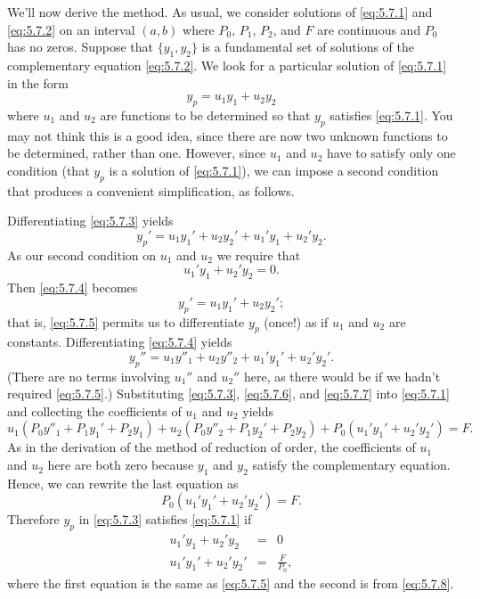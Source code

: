 \documentclass{ximera}
\begin{document}
We'll now derive the method. As usual, we consider solutions of
\eqref{eq:5.7.1} and \eqref{eq:5.7.2} on an interval $(a,b)$ where  $P_0$,
$P_1$, $P_2$, and $F$ are continuous and $P_0$ has no zeros. Suppose
that $\{y_1,y_2\}$ is a fundamental set of solutions of the
complementary equation \eqref{eq:5.7.2}. We look for
 a particular solution of \eqref{eq:5.7.1} in the form
\begin{equation} \label{eq:5.7.3}
y_p=u_1y_1+u_2y_2
\end{equation}
where $u_1$ and $u_2$ are functions to be determined so that $y_p$
satisfies \eqref{eq:5.7.1}. You may not think this is a good idea, since
there are now two unknown functions to be determined, rather than one.
However, since $u_1$ and $u_2$ have to satisfy only one condition
(that $y_p$ is a solution of \eqref{eq:5.7.1}), we can impose a second
condition that produces a convenient simplification, as follows.

 Differentiating \eqref{eq:5.7.3} yields
\begin{equation} \label{eq:5.7.4}
y_p'=u_1y_1'+u_2y_2'+u_1'y_1+u_2'y_2.
\end{equation}
As our second condition on $u_1$ and $u_2$
 we require that
\begin{equation} \label{eq:5.7.5}
u_1'y_1+u_2'y_2=0.
\end{equation}
 Then  \eqref{eq:5.7.4} becomes
\begin{equation}
y_p'=u_1y_1'+u_2y_2';     \label{eq:5.7.6}
\end{equation}
that is, \eqref{eq:5.7.5} permits us to differentiate $y_p$ (once!) as if
 $u_1$ and $u_2$ are constants. Differentiating
\eqref{eq:5.7.4} yields \begin{equation} \label{eq:5.7.7}
y_p''=u_1y''_1+u_2y''_2+u_1'y_1'+u_2'y_2'. \end{equation}
(There are no terms involving $u_1''$ and $u_2''$ here, as there would
be if we hadn't required \eqref{eq:5.7.5}.) Substituting \eqref{eq:5.7.3},
\eqref{eq:5.7.6}, and \eqref{eq:5.7.7} into \eqref{eq:5.7.1} and collecting the
coefficients of $u_1$ and $u_2$ yields
$$
u_1(P_0y''_1+P_1y_1'+P_2y_1)+u_2(P_0y''_2+P_1y_2'+P_2y_2)
+P_0(u_1'y_1'+u_2'y_2')=F.
$$
As in the derivation of the method of reduction of order, the
coefficients of $u_1$ and $u_2$ here are both zero because $y_1$ and
$y_2$ satisfy the complementary equation. Hence, we can rewrite the
last equation  as
\begin{equation}\label{eq:5.7.8}
  P_0(u_1'y_1'+u_2'y_2')=F.
\end{equation}
Therefore $y_p$ in \eqref{eq:5.7.3} satisfies \eqref{eq:5.7.1} if
\begin{equation} \label{eq:5.7.9}
\begin{array}{rcl}
u_1'y_1+u_2'y_2 &=& 0  \\
u_1'y_1'+u_2'y_2' &=& \frac{F}{P_0},
\end{array}
\end{equation}
where the first equation is the same as \eqref{eq:5.7.5} and the second is
from \eqref{eq:5.7.8}.
\end{document}
